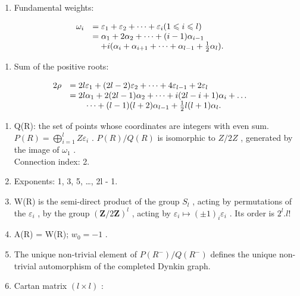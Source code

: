 \begin{enumerate}
\def\labelenumi{(\Roman{enumi})}
\setcounter{enumi}{5}
\tightlist
\item
  Fundamental weights:
\end{enumerate}

\[
\begin{array}{r l} \omega_ {i} & = \varepsilon_ {1} + \varepsilon_ {2} + \dots + \varepsilon_ {i} (1 \leqslant i \leqslant l) \\ & = \alpha_ {1} + 2 \alpha_ {2} + \dots + (i - 1) \alpha_ {i - 1} \\ & \quad + i (\alpha_ {i} + \alpha_ {i + 1} + \dots + \alpha_ {l - 1} + \frac {1}{2} \alpha_ {l}). \end{array}
\]

\begin{enumerate}
\def\labelenumi{(\Roman{enumi})}
\setcounter{enumi}{6}
\tightlist
\item
  Sum of the positive roots:
\end{enumerate}

\[
\begin{array}{r l} 2 \rho & = 2 l \varepsilon_ {1} + (2 l - 2) \varepsilon_ {2} + \dots + 4 \varepsilon_ {l - 1} + 2 \varepsilon_ {l} \\ & = 2 l \alpha_ {1} + 2 (2 l - 1) \alpha_ {2} + \dots + i (2 l - i + 1) \alpha_ {i} + \dots \\ & \qquad \dots + (l - 1) (l + 2) \alpha_ {l - 1} + \frac {1}{2} l (l + 1) \alpha_ {l}. \end{array}
\]

\begin{enumerate}
\def\labelenumi{(\Roman{enumi})}
\setcounter{enumi}{7}
\item
  Q(R): the set of points whose coordinates are integers with even sum. \(P(R) = \bigoplus_{i=1}^{l} Z \varepsilon_i\) . \(P(R)/Q(R)\) is isomorphic to \(Z/2Z\) , generated by the image of \(\omega_1\) .\\
  Connection index: 2.
\item
  Exponents: 1, 3, 5, \ldots, 2l - 1.
\item
  W(R) is the semi-direct product of the group \(S_{l}\) , acting by permutations of the \(\varepsilon_{i}\) , by the group \((\mathbf{Z}/2\mathbf{Z})^{l}\) , acting by \(\varepsilon_{i} \mapsto (\pm1)_{i}\varepsilon_{i}\) . Its order is \(2^{l}.l!\)
\item
  A(R) = W(R); \(w_{0} = -1\) .
\item
  The unique non-trivial element of \(P(R^{-})/Q(R^{-})\) defines the unique non-trivial automorphism of the completed Dynkin graph.
\item
  Cartan matrix \((l\times l)\) :
\end{enumerate}

